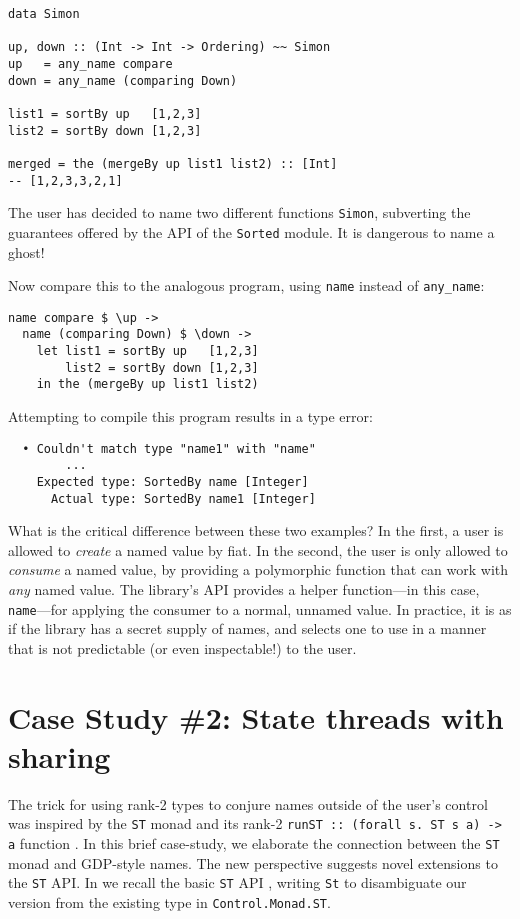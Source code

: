 \documentclass[format=sigplan, review=false, screen=true]{acmart}
\begin{document}
\begin{verbatim}
data Simon
  
up, down :: (Int -> Int -> Ordering) ~~ Simon
up   = any_name compare
down = any_name (comparing Down)

list1 = sortBy up   [1,2,3]
list2 = sortBy down [1,2,3]

merged = the (mergeBy up list1 list2) :: [Int]
-- [1,2,3,3,2,1]
\end{verbatim}
\noindent
The user has decided to name two different functions \texttt{Simon}, subverting the
guarantees offered by the API of the \texttt{Sorted} module. It is dangerous to
name a ghost!

Now compare this to the analogous program, using \texttt{name} instead of \texttt{any\_name}:
\begin{verbatim}
name compare $ \up ->
  name (comparing Down) $ \down ->
    let list1 = sortBy up   [1,2,3]
        list2 = sortBy down [1,2,3]
    in the (mergeBy up list1 list2)
\end{verbatim}
\noindent
Attempting to compile this program results in a type error:

\begin{lstlisting}
  • Couldn't match type "name1" with "name"
        ...
    Expected type: SortedBy name [Integer]
      Actual type: SortedBy name1 [Integer]
\end{lstlisting}
\noindent
What is the critical difference between these two examples? In the first, a user is
allowed to \emph{create} a named value by fiat. In the second, the user is only allowed to \emph{consume} a named value, by
providing a polymorphic function that can work with \emph{any} named value. The library's API provides
a helper function---in this case, \texttt{name}---for applying the consumer to a normal, unnamed value.
In practice, it is as if the
library has a secret supply of names, and selects one to use in a manner that is not
predictable (or even inspectable!) to the user.


\section{Case Study \#2: State threads with sharing}
The trick for using rank-2 types to conjure names outside of the user's control was
inspired by the \texttt{ST} monad and its rank-2 \texttt{runST :: (forall s. ST s a) -> a}
function \cite{launchbury1994lazy}. In this brief case-study, we elaborate the connection
between the \texttt{ST} monad and GDP-style names. The new perspective suggests novel
extensions to the \texttt{ST} API.
In  we recall the basic \texttt{ST} API \cite{launchbury1994lazy}, writing \texttt{St} to
disambiguate our version from the existing type in \texttt{Control.Monad.ST}.
\end{document}
